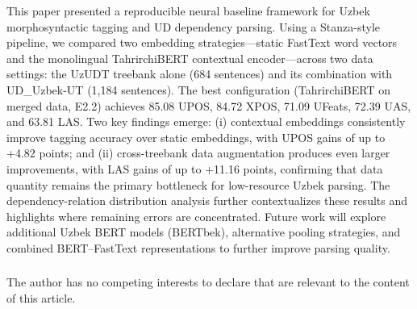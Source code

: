 \documentclass[runningheads]{llncs}
\begin{document}
This paper presented a reproducible neural baseline framework for Uzbek morphosyntactic tagging and UD dependency parsing. Using a Stanza-style pipeline, we compared two embedding strategies---static FastText word vectors and the monolingual TahrirchiBERT contextual encoder---across two data settings: the UzUDT treebank alone (684 sentences) and its combination with UD\_Uzbek-UT (1{,}184 sentences). The best configuration (TahrirchiBERT on merged data, E2.2) achieves 85.08 UPOS, 84.72 XPOS, 71.09 UFeats, 72.39 UAS, and 63.81 LAS. Two key findings emerge: (i) contextual embeddings consistently improve tagging accuracy over static embeddings, with UPOS gains of up to +4.82 points; and (ii) cross-treebank data augmentation produces even larger improvements, with LAS gains of up to +11.16 points, confirming that data quantity remains the primary bottleneck for low-resource Uzbek parsing. The dependency-relation distribution analysis further contextualizes these results and highlights where remaining errors are concentrated. Future work will explore additional Uzbek BERT models (BERTbek), alternative pooling strategies, and combined BERT--FastText representations to further improve parsing quality.


\begin{credits}
\subsubsection{\discintname} The author has no competing interests to declare that are relevant to the content of this article.
\end{credits}
%
%
%


%
\end{document}
